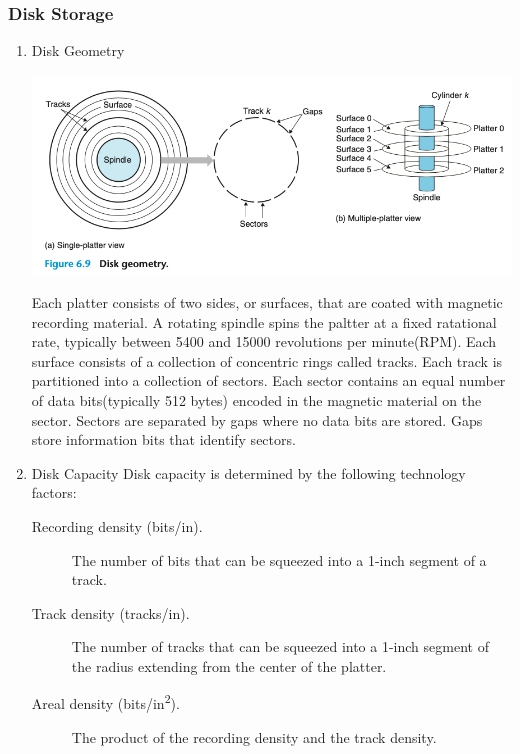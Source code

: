 \documentclass[11pt]{article}
\begin{document}
\subsubsection{Disk Storage}
\label{sec:orgc55cd81}

\begin{enumerate}
\item Disk Geometry
\label{sec:orgd3b99d9}

\begin{center}
\includegraphics[width=.9\linewidth]{pics/figure6.9-disk-geometry.png}
\end{center}

Each platter consists of two sides, or surfaces, that are coated with magnetic recording material. A rotating spindle spins the paltter at a fixed ratational rate, typically between 5400 and 15000 revolutions per minute(RPM). Each surface consists of a collection of concentric rings called tracks. Each track is partitioned into a collection of sectors. Each sector contains an equal number of data bits(typically 512 bytes) encoded in the magnetic material on the sector. Sectors are separated by gaps where no data bits are stored. Gaps store information bits that identify sectors.\\

\item Disk Capacity
\label{sec:orgc6b0e03}
Disk capacity is determined by the following technology factors:\\
\begin{description}
\item[{Recording density (bits/in).}] The number of bits that can be squeezed into a 1-inch segment of a track.\\
\item[{Track density (tracks/in).}] The number of tracks that can be squeezed into a 1-inch segment of the radius extending from the center of the platter.\\
\item[{Areal density (bits/in\textsuperscript{2}).}] The product of the recording density and the track density.\\
\end{description}


\end{enumerate}
\end{document}
